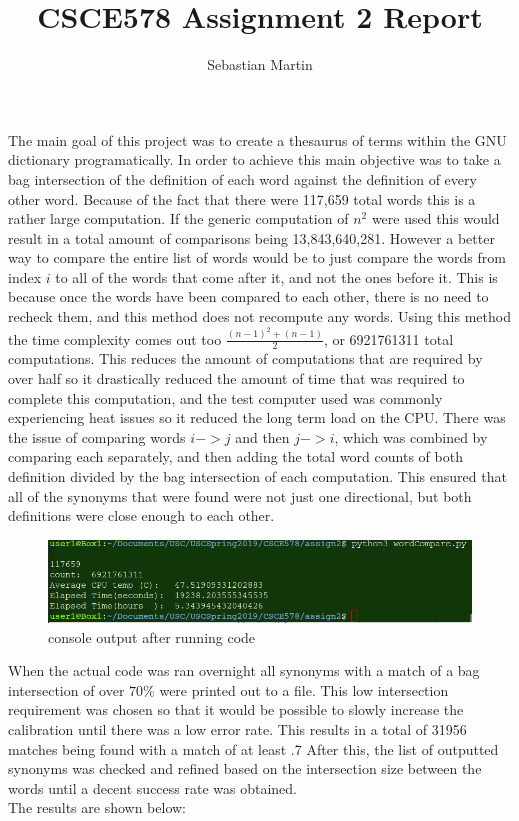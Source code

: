 \documentclass{article}
\title{
CSCE578 Assignment 2 Report
}
\author{Sebastian Martin}
\begin{document}
\maketitle


\begin{addmargin}[4em]{4em}
The main goal of this project was to create a thesaurus of terms within the GNU dictionary programatically. In order to achieve this main objective was to take a bag intersection of the definition of each word against the definition of every other word. Because of the fact that there were 117,659 total words this is a rather large computation. If the generic computation of $n^2$ were used this would result in a total amount of comparisons being 13,843,640,281. However a better way to compare the entire list of words would be to just compare the words from index $i$ to all of the words that come after it, and not the ones before it. This is because once the words have been compared to each other, there is no need to recheck them, and this method does not recompute any words. Using this method the time complexity comes out too $\frac{(n-1)^2 + (n-1)}{2}$, or 6921761311 total computations. This reduces the amount of computations that are required by over half so it drastically reduced the amount of time that was required to complete this computation, and the test computer used was commonly experiencing heat issues so it reduced the long term load on the CPU. There was the issue of comparing words $i -> j$ and then $j-> i$, which was combined by comparing each separately, and then adding the total word counts of both definition divided by the bag intersection of each computation. This ensured that all of the synonyms that were found were not just one directional, but both definitions were close enough to each other.\\
\begin{figure}[!hb]
  \includegraphics[width=\linewidth]{download.png}
  \caption{console output after running code}
\end{figure}
\par When the actual code was ran overnight all synonyms with a match of a bag intersection of over $70\%$ were printed out to a file. This low intersection requirement was chosen so that it would be possible to slowly increase the calibration until there was a low error rate. This results in a total of 31956 matches being found with a match of at least .7  After this, the list of outputted synonyms was checked and refined based on the intersection size between the words until a decent success rate was obtained. \\The results are shown below:

\end{addmargin}
\end{document}
